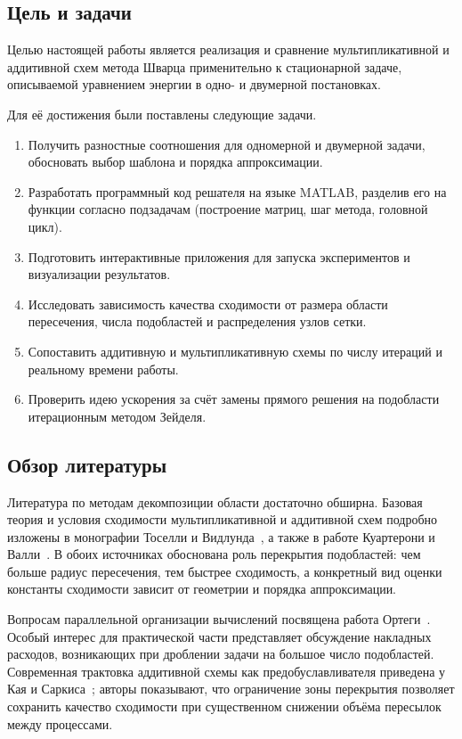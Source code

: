 \subsection{Цель и задачи}

Целью настоящей работы является реализация и сравнение мультипликативной и
аддитивной схем метода Шварца применительно к стационарной задаче, описываемой
уравнением энергии в одно- и двумерной постановках.

Для её достижения были поставлены следующие задачи.
\begin{enumerate}
    \item Получить разностные соотношения для одномерной и двумерной задачи,
    обосновать выбор шаблона и порядка аппроксимации.
    \item Разработать программный код решателя на языке MATLAB, разделив его на
    функции согласно подзадачам (построение матриц, шаг метода, головной цикл).
    \item Подготовить интерактивные приложения для запуска экспериментов и
    визуализации результатов.
    \item Исследовать зависимость качества сходимости от размера области
    пересечения, числа подобластей и распределения узлов сетки.
    \item Сопоставить аддитивную и мультипликативную схемы по числу итераций
    и реальному времени работы.
    \item Проверить идею ускорения за счёт замены прямого решения на
    подобласти итерационным методом Зейделя.
\end{enumerate}

\subsection{Обзор литературы}

Литература по методам декомпозиции области достаточно обширна. Базовая теория
и условия сходимости мультипликативной и аддитивной схем подробно изложены в
монографии Тоселли и Видлунда~\cite{toselli2005}, а также в работе Куартерони и
Валли~\cite{quarteroni1999}. В обоих источниках обоснована роль перекрытия
подобластей: чем больше радиус пересечения, тем быстрее сходимость, а
конкретный вид оценки константы сходимости зависит от геометрии и порядка
аппроксимации.

Вопросам параллельной организации вычислений посвящена работа
Ортеги~\cite{ortega1991}. Особый интерес для практической части представляет
обсуждение накладных расходов, возникающих при дроблении задачи на большое
число подобластей. Современная трактовка аддитивной схемы как
предобуславливателя приведена у Кая и Саркиса~\cite{cai1999}; авторы
показывают, что ограничение зоны перекрытия позволяет сохранить качество
сходимости при существенном снижении объёма пересылок между процессами.

